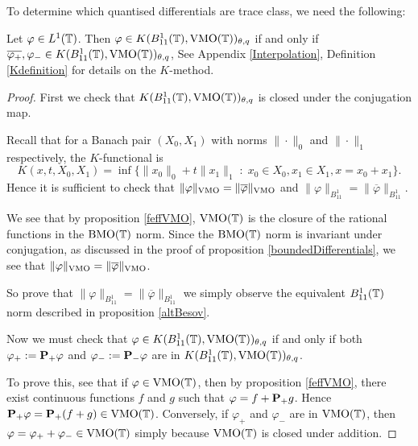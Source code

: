 To determine which quantised differentials are trace class, we need
the following:
\begin{lemma}
\label{Kinvariance}
    Let $\varphi \in L^1(\mathbb{T})$. Then $\varphi \in K(B_{11}^1(\mathbb{T}),\operatorname{VMO}(\mathbb{T}))_{\theta,q}$ if and only
    if $\overline{\varphi_+},\varphi_- \in K(B_{11}^1(\mathbb{T}),\operatorname{VMO}(\mathbb{T}))_{\theta,q}$,
    See Appendix \ref{Interpolation}, Definition \ref{Kdefinition} for details
    on the $K$-method.
\end{lemma}
\begin{proof}
    First we check that $K(B_{11}^1(\mathbb{T}),\operatorname{VMO}(\mathbb{T}))_{\theta,q}$
    is closed under the conjugation map. 

    Recall that for a Banach pair $(X_0,X_1)$ with norms $\|\cdot\|_0$ and $\|\cdot\|_1$ 
    respectively,
    the $K$-functional is
    \begin{equation*}
        K(x,t,X_0,X_1) = \inf\{\|x_0\|_0+t\|x_1\|_1\;:\; x_0 \in X_0,x_1 \in X_1,x = x_0+x_1\}.
    \end{equation*}
    Hence it is sufficient to check that $\|\varphi\|_{\operatorname{VMO}} = \|\overline{\varphi}\|_{\operatorname{VMO}}$
    and $\|\varphi\|_{B_{11}^1} = \|\overline{\varphi}\|_{B_{11}^1}$.
    
    We see that by proposition \ref{feffVMO}, $\operatorname{VMO}(\mathbb{T})$
    is the closure of the rational functions in the $\operatorname{BMO}(\mathbb{T})$ norm. Since
    the $\operatorname{BMO}(\mathbb{T})$ norm is invariant under conjugation, as
    discussed in the proof of proposition \ref{boundedDifferentials}, we
    see that $\|\varphi\|_{\operatorname{VMO}} = \|\overline{\varphi}\|_{\operatorname{VMO}}$.
    
    So prove that $\|\varphi\|_{B_{11}^1} = \|\overline{\varphi}\|_{B_{11}^1}$
    we simply observe the equivalent $B_{11}^1(\mathbb{T})$ norm described in
    proposition \ref{altBesov}.
    
    Now we must check that $\varphi \in K(B_{11}^1(\mathbb{T}),\operatorname{VMO}(\mathbb{T}))_{\theta,q}$
    if and only if both $\varphi_+ := \mathbf{P}_+\varphi$ and $\varphi_- := \mathbf{P}_-\varphi$
    are in $K(B_{11}^1(\mathbb{T}),\operatorname{VMO}(\mathbb{T}))_{\theta,q}$.
    
    To prove this, see that if $\varphi \in \operatorname{VMO}(\mathbb{T})$,
    then by proposition \ref{feffVMO}, there exist continuous
    functions $f$ and $g$ such that $\varphi = f+\mathbf{P}_+g$. 
    Hence $\mathbf{P}_+\varphi = \mathbf{P}_+(f+g) \in \operatorname{VMO}(\mathbb{T})$.
    Conversely, if $\varphi_+$ and $\varphi_-$ are in $\operatorname{VMO}(\mathbb{T})$,
    then $\varphi = \varphi_++\varphi_- \in \operatorname{VMO}(\mathbb{T})$ simply
    because $\operatorname{VMO}(\mathbb{T})$ is closed under addition.
    

\end{proof}

